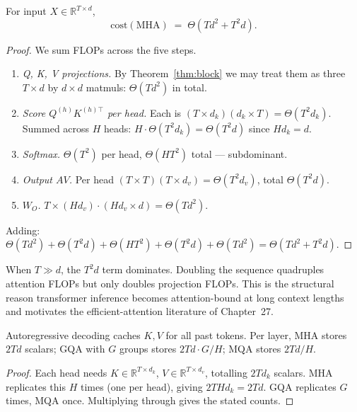 \begin{theorem}
\label{thm:compute}
For input $X \in \mathbb{R}^{T \times d}$,
\[
\boxed{\;\mathrm{cost}(\mathrm{MHA}) \;=\; \Theta(T d^2 + T^2 d).\;}
\]
\end{theorem}
\begin{proof}
We sum FLOPs across the five steps.
\begin{enumerate}
  \item \emph{Q, K, V projections.} By Theorem~\ref{thm:block} we may treat them as three $T \times d$ by $d \times d$ matmuls: $\Theta(T d^2)$ in total.
  \item \emph{Score $Q^{(h)} K^{(h)\top}$ per head.} Each is $(T \times d_k)(d_k \times T) = \Theta(T^2 d_k)$. Summed across $H$ heads: $H \cdot \Theta(T^2 d_k) = \Theta(T^2 d)$ since $H d_k = d$.
  \item \emph{Softmax.} $\Theta(T^2)$ per head, $\Theta(H T^2)$ total --- subdominant.
  \item \emph{Output $A V$.} Per head $(T \times T)(T \times d_v) = \Theta(T^2 d_v)$, total $\Theta(T^2 d)$.
  \item \emph{$W_O$.} $T \times (H d_v) \cdot (H d_v \times d) = \Theta(T d^2)$.
\end{enumerate}
Adding: $\Theta(T d^2) + \Theta(T^2 d) + \Theta(H T^2) + \Theta(T^2 d) + \Theta(T d^2) = \Theta(T d^2 + T^2 d)$.
\end{proof}

\begin{corollary}
When $T \gg d$, the $T^2 d$ term dominates. Doubling the sequence quadruples attention FLOPs but only doubles projection FLOPs. This is the structural reason transformer inference becomes attention-bound at long context lengths and motivates the efficient-attention literature of Chapter~27.
\end{corollary}

\begin{theorem}
\label{thm:kvcache}
Autoregressive decoding caches $K, V$ for all past tokens. Per layer, MHA stores $2 T d$ scalars; GQA with $G$ groups stores $2 T d \cdot G/H$; MQA stores $2 T d / H$.
\end{theorem}
\begin{proof}
Each head needs $K \in \mathbb{R}^{T \times d_k}$, $V \in \mathbb{R}^{T \times d_v}$, totalling $2 T d_k$ scalars. MHA replicates this $H$ times (one per head), giving $2 T H d_k = 2 T d$. GQA replicates $G$ times, MQA once. Multiplying through gives the stated counts.
\end{proof}


